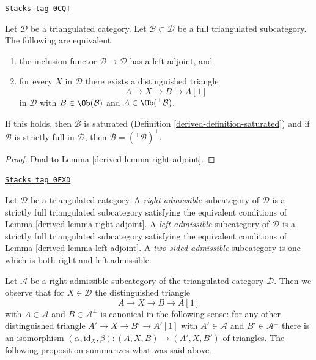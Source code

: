\begin{lemma}
\label{derived-lemma-left-adjoint}
\href{https://stacks.math.columbia.edu/tag/0CQT}{\texttt{Stacks tag 0CQT}}

Let $\mathcal{D}$ be a triangulated category. Let
$\mathcal{B} \subset \mathcal{D}$ be a full triangulated subcategory.
The following are equivalent
\begin{enumerate}
\item the inclusion functor $\mathcal{B} \to \mathcal{D}$
has a left adjoint, and
\item for every $X$ in $\mathcal{D}$ there exists a distinguished
triangle
$$
A \to X \to B \to A[1]
$$
in $\mathcal{D}$ with $B \in \Ob(\mathcal{B})$ and
$A \in \Ob({}^\perp\mathcal{B})$.
\end{enumerate}
If this holds, then $\mathcal{B}$ is saturated
(Definition \ref{derived-definition-saturated}) and if $\mathcal{B}$
is strictly full in $\mathcal{D}$, then
$\mathcal{B} = ({}^\perp\mathcal{B})^\perp$.
\end{lemma}

\begin{proof}

Dual to Lemma \ref{derived-lemma-right-adjoint}.
\end{proof}

\begin{definition}[Admissible]
\label{derived-definition-admissible}
\href{https://stacks.math.columbia.edu/tag/0FXD}{\texttt{Stacks tag 0FXD}}

Let $\mathcal{D}$ be a triangulated category. A {\it right admissible}
subcategory of $\mathcal{D}$ is a strictly full triangulated subcategory
satisfying the equivalent conditions of Lemma \ref{derived-lemma-right-adjoint}.
A {\it left admissible}
subcategory of $\mathcal{D}$ is a strictly full triangulated subcategory
satisfying the equivalent conditions of Lemma \ref{derived-lemma-left-adjoint}.
A {\it two-sided admissible} subcategory is one which is both
right and left admissible.
\end{definition}

Let $\mathcal{A}$ be a right admissible subcategory of the triangulated
category $\mathcal{D}$. Then we observe that for $X \in \mathcal{D}$
the distinguished triangle
$$
A \to X \to B \to A[1]
$$
with $A \in \mathcal{A}$ and $B \in \mathcal{A}^\perp$
is canonical in the following sense: for any other distinguished triangle
$A' \to X \to B' \to A'[1]$ with $A' \in \mathcal{A}$ and
$B' \in \mathcal{A}^\perp$ there is an isomorphism
$(\alpha, \text{id}_X, \beta) : (A, X, B) \to (A', X, B')$
of triangles. The following proposition summarizes what was said above.

